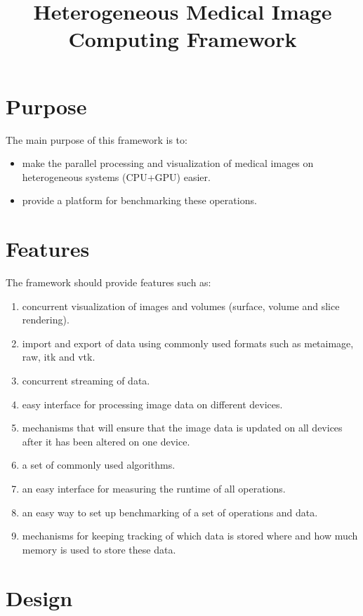 \documentclass{article}
\title{Heterogeneous Medical Image Computing Framework}
\date{}
\begin{document}
\maketitle

\section{Purpose}

The main purpose of this framework is to:
\begin{itemize}
    \itemsep 1pt
    \item make the parallel processing and visualization of medical images on heterogeneous systems (CPU+GPU) easier.
    \item provide a platform for benchmarking these operations.
\end{itemize}

\section{Features}

The framework should provide features such as:
\begin{enumerate}
    \itemsep 1pt
    \item concurrent visualization of images and volumes (surface, volume and slice rendering).
    \item import and export of data using commonly used formats such as metaimage, raw, itk and vtk.
    \item concurrent streaming of data.
    \item easy interface for processing image data on different devices. 
    \item mechanisms that will ensure that the image data is updated on all devices after it has been altered on one device.
    \item a set of commonly used algorithms.
    \item an easy interface for measuring the runtime of all operations.
    \item an easy way to set up benchmarking of a set of operations and data.
    \item mechanisms for keeping tracking of which data is stored where and how much memory is used to store these data.
\end{enumerate}

\section{Design}
\end{document}
